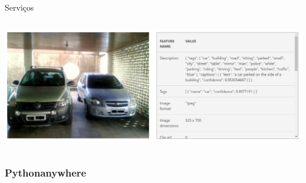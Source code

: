 \documentclass{beamer}
\begin{document}
\begin{frame}{Serviços}
\begin{columns}
\begin{column}{0.5\textwidth}
\begin{center}
\includegraphics[width=1\textwidth]{img/Azuri_4.png}   
\end{center}
\end{column}
\end{columns}
\end{frame}













\subsubsection{Pythonanywhere}
\end{document}
